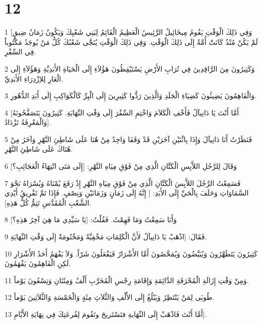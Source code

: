 \chapter{12}

\par 1 [وَفِي ذَلِكَ الْوَقْتِ يَقُومُ مِيخَائِيلُ الرَّئِيسُ الْعَظِيمُ الْقَائِمُ لِبَنِي شَعْبِكَ وَيَكُونُ زَمَانُ ضِيقٍ لَمْ يَكُنْ مُنْذُ كَانَتْ أُمَّةٌ إِلَى ذَلِكَ الْوَقْتِ. وَفِي ذَلِكَ الْوَقْتِ يُنَجَّى شَعْبُكَ كُلُّ مَنْ يُوجَدُ مَكْتُوباً فِي السِّفْرِ.
\par 2 وَكَثِيرُونَ مِنَ الرَّاقِدِينَ فِي تُرَابِ الأَرْضِ يَسْتَيْقِظُونَ هَؤُلاَءِ إِلَى الْحَيَاةِ الأَبَدِيَّةِ وَهَؤُلاَءِ إِلَى الْعَارِ لِلاِزْدِرَاءِ الأَبَدِيِّ.
\par 3 وَالْفَاهِمُونَ يَضِيئُونَ كَضِيَاءِ الْجَلَدِ وَالَّذِينَ رَدُّوا كَثِيرِينَ إِلَى الْبِرِّ كَالْكَوَاكِبِ إِلَى أَبَدِ الدُّهُورِ.
\par 4 [أَمَّا أَنْتَ يَا دَانِيآلُ فَأَخْفِ الْكَلاَمَ وَاخْتِمِ السِّفْرَ إِلَى وَقْتِ النِّهَايَةِ. كَثِيرُونَ يَتَصَفَّحُونَهُ وَالْمَعْرِفَةُ تَزْدَادُ].
\par 5 فَنَظَرْتُ أَنَا دَانِيآلَ وَإِذَا بِاثْنَيْنِ آخَرَيْنِ قَدْ وَقَفَا وَاحِدٌ مِنْ هُنَا عَلَى شَاطِئِ النَّهْرِ وَآخَرُ مِنْ هُنَاكَ عَلَى شَاطِئِ النَّهْرِ.
\par 6 وَقَالَ لِلرَّجُلِ اللاَّبِسِ الْكَتَّانِ الَّذِي مِنْ فَوْقِ مِيَاهِ النَّهْرِ: [إِلَى مَتَى انْتِهَاءُ الْعَجَائِبِ؟]
\par 7 فَسَمِعْتُ الرَّجُلَ اللاَّبِسَ الْكَتَّانِ الَّذِي مِنْ فَوْقِ مِيَاهِ النَّهْرِ إِذْ رَفَعَ يُمْنَاهُ وَيُسْرَاهُ نَحْوَ السَّمَاوَاتِ وَحَلَفَ بِالْحَيِّ إِلَى الأَبَدِ: [ إِنَّهُ إِلَى زَمَانٍ وَزَمَانَيْنِ وَنِصْفٍ. فَإِذَا تَمَّ تَفْرِيقُ أَيْدِي الشَّعْبِ الْمُقَدَّسِ تَتِمُّ كُلُّ هَذِهِ].
\par 8 وَأَنَا سَمِعْتُ وَمَا فَهِمْتُ. فَقُلْتُ: [يَا سَيِّدِي مَا هِيَ آخِرُ هَذِهِ؟]
\par 9 فَقَالَ: [اذْهَبْ يَا دَانِيآلُ لأَنَّ الْكَلِمَاتِ مَخْفِيَّةٌ وَمَخْتُومَةٌ إِلَى وَقْتِ النِّهَايَةِ.
\par 10 كَثِيرُونَ يَتَطَهَّرُونَ وَيُبَيَّضُونَ وَيُمَحَّصُونَ أَمَّا الأَشْرَارُ فَيَفْعَلُونَ شَرّاً. وَلاَ يَفْهَمُ أَحَدُ الأَشْرَارِ لَكِنِ الْفَاهِمُونَ يَفْهَمُونَ.
\par 11 وَمِنْ وَقْتِ إِزَالَةِ الْمُحْرَقَةِ الدَّائِمَةِ وَإِقَامَةِ رِجْسِ الْمُخَرَّبِ أَلْفٌ وَمِئَتَانِ وَتِسْعُونَ يَوْماً.
\par 12 طُوبَى لِمَنْ يَنْتَظِرُ وَيَبْلُغُ إِلَى الأَلْفِ وَالثَّلاَثِ مِئَةٍ وَالْخَمْسَةِ وَالثَّلاَثِينَ يَوْماً.
\par 13 أَمَّا أَنْتَ فَاذْهَبْ إِلَى النِّهَايةِ فتَسْتَريحَ وتَقُومَ لِقُرعَتِكَ فِي نِهَايَةِ الأَيَّامِ].

